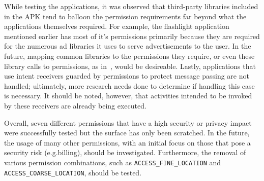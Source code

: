 While testing the applications, it was observed that third-party libraries included in the APK tend to balloon the permission requirements far beyond what the applications themselves required. For example, the flashlight application mentioned earlier has most of it's permissions primarily because they are required for the numerous ad libraries it uses to serve advertisements to the user. In the future, mapping common libraries to the permissions they require, or even these library calls to permissions, as in~\cite{Felt}, would be desireable. Lastly, applications that use intent receivers guarded by permissions to protect message passing are not handled; ultimately, more research needs done to determine if handling this case is necessary.  It should be noted, however, that activities intended to be invoked by these receivers are already being executed.

Overall, seven different permissions that have a high security or privacy impact were successfully tested but the surface has only been scratched. In the future, the usage of many other permissions, with an initial focus on those that pose a security risk (e.g.billing), should be investigated. Furthermore, the removal of various permission combinations, such as \texttt{ACCESS\_FINE\_LOCATION} and \texttt{ACCESS\_COARSE\_LOCATION}, should be tested.  
